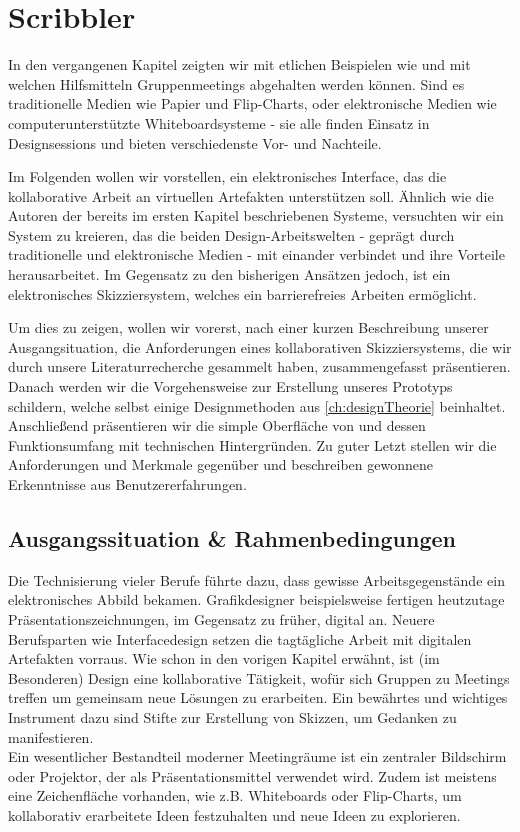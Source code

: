 \chapter{Scribbler}\label{ch:scribbler}

In den vergangenen Kapitel zeigten wir mit etlichen Beispielen wie und mit welchen Hilfsmitteln Gruppenmeetings abgehalten werden können. Sind es traditionelle Medien wie Papier und Flip-Charts, oder elektronische Medien wie computerunterstützte Whiteboardsysteme - sie alle finden Einsatz in Designsessions und bieten verschiedenste Vor- und Nachteile.

\medskip Im Folgenden wollen wir \scribbler vorstellen, ein elektronisches Interface, das die kollaborative Arbeit an virtuellen Artefakten unterstützen soll. Ähnlich wie die Autoren der bereits im ersten Kapitel beschriebenen Systeme, versuchten wir ein System zu kreieren, das die beiden Design-Arbeitswelten - geprägt durch traditionelle und elektronische Medien - mit einander verbindet und ihre Vorteile herausarbeitet. Im Gegensatz zu den bisherigen Ansätzen jedoch, ist \scribbler ein elektronisches Skizziersystem, welches ein barrierefreies Arbeiten ermöglicht.

\medskip Um dies zu zeigen, wollen wir vorerst, nach einer kurzen Beschreibung unserer Ausgangsituation, die Anforderungen eines kollaborativen Skizziersystems, die wir durch unsere Literaturrecherche gesammelt haben, zusammengefasst präsentieren. Danach werden wir die Vorgehensweise zur Erstellung unseres Prototyps schildern, welche selbst einige Designmethoden aus \autoref{ch:designTheorie} beinhaltet. Anschließend präsentieren wir die simple Oberfläche von \scribbler und dessen Funktionsumfang mit technischen Hintergründen. Zu guter Letzt stellen wir die Anforderungen und Merkmale gegenüber und beschreiben gewonnene Erkenntnisse aus Benutzererfahrungen.

\section{Ausgangssituation \& Rahmenbedingungen} \label{sec:ausgangssituation}
Die Technisierung vieler Berufe führte dazu, dass gewisse Arbeitsgegenstände ein elektronisches Abbild bekamen. Grafikdesigner beispielsweise fertigen heutzutage Präsentationszeichnungen, im Gegensatz zu früher, digital an. Neuere Berufsparten wie Interfacedesign setzen die tagtägliche Arbeit mit digitalen Artefakten vorraus. Wie schon in den vorigen Kapitel erwähnt, ist (im Besonderen) Design eine kollaborative Tätigkeit, wofür sich Gruppen zu Meetings treffen um gemeinsam neue Lösungen zu erarbeiten. Ein bewährtes und wichtiges Instrument dazu sind Stifte zur Erstellung von Skizzen, um Gedanken zu manifestieren.\\
Ein wesentlicher Bestandteil moderner Meetingräume ist ein zentraler Bildschirm oder Projektor, der als Präsentationsmittel verwendet wird. Zudem ist meistens eine Zeichenfläche vorhanden, wie z.B. Whiteboards oder Flip-Charts, um kollaborativ erarbeitete Ideen festzuhalten und neue Ideen zu explorieren.

